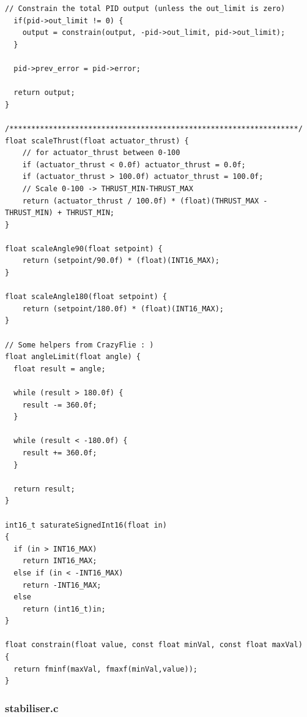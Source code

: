 \begin{lstlisting}[caption={controller.c}]
  // Constrain the total PID output (unless the out_limit is zero)
  if(pid->out_limit != 0) {
    output = constrain(output, -pid->out_limit, pid->out_limit);
  }

  pid->prev_error = pid->error;

  return output;
}

/******************************************************************/
float scaleThrust(float actuator_thrust) {
    // for actuator_thrust between 0-100
    if (actuator_thrust < 0.0f) actuator_thrust = 0.0f;
    if (actuator_thrust > 100.0f) actuator_thrust = 100.0f;
    // Scale 0-100 -> THRUST_MIN-THRUST_MAX
    return (actuator_thrust / 100.0f) * (float)(THRUST_MAX - THRUST_MIN) + THRUST_MIN;
}

float scaleAngle90(float setpoint) {
    return (setpoint/90.0f) * (float)(INT16_MAX);
}

float scaleAngle180(float setpoint) {
    return (setpoint/180.0f) * (float)(INT16_MAX);
}

// Some helpers from CrazyFlie : )
float angleLimit(float angle) {
  float result = angle;

  while (result > 180.0f) {
    result -= 360.0f;
  }

  while (result < -180.0f) {
    result += 360.0f;
  }

  return result;
}

int16_t saturateSignedInt16(float in)
{
  if (in > INT16_MAX)
    return INT16_MAX;
  else if (in < -INT16_MAX)
    return -INT16_MAX;
  else
    return (int16_t)in;
}

float constrain(float value, const float minVal, const float maxVal)
{
  return fminf(maxVal, fmaxf(minVal,value));
}

\end{lstlisting}

\subsubsection{stabiliser.c}

